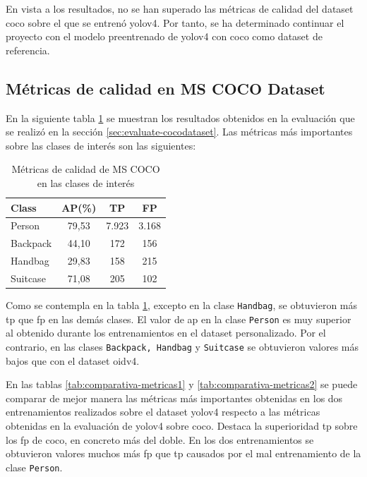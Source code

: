 En vista a los resultados, no se han superado las métricas de calidad del dataset \gls{coco} sobre el que se entrenó \gls{yolov4}. Por tanto, se ha determinado continuar el proyecto con el modelo preentrenado de \gls{yolov4} con \gls{coco} como dataset de referencia.

\subsection{Métricas de calidad en MS COCO Dataset}
\label{subsec:metricas-calidad-coco}

En la siguiente tabla \ref{tab:metricas-clases-coco} se muestran los resultados obtenidos en la evaluación que se realizó en la sección \ref{sec:evaluate-cocodataset}. Las métricas más importantes sobre las clases de interés son las siguientes:

\begin{table}[ht]
\centering
\caption{Métricas de calidad de MS COCO en las clases de interés}
\label{tab:metricas-clases-coco}
\begin{tabular}{lccc}
\hline
\textbf{Class} & \textbf{AP(\%)} & \textbf{TP} & \textbf{FP} \\ \hline
Person         & 79,53           & 7.923       & 3.168       \\
Backpack       & 44,10           & 172         & 156         \\
Handbag        & 29,83           & 158         & 215         \\
Suitcase       & 71,08           & 205         & 102         \\ \hline
\end{tabular}
\end{table}

Como se contempla en la tabla \ref{tab:metricas-clases-coco}, excepto en la clase \texttt{Handbag}, se obtuvieron más \gls{tp} que \gls{fp} en las demás clases. El valor de \gls{ap} en la clase \texttt{Person} es muy superior al obtenido durante los entrenamientos en el dataset personalizado. Por el contrario, en las clases \texttt{Backpack, Handbag} y \texttt{Suitcase} se obtuvieron valores más bajos que con el dataset \gls{oidv4}.

En las tablas \ref{tab:comparativa-metricas1} y \ref{tab:comparativa-metricas2} se puede comparar de mejor manera las métricas más importantes obtenidas en los dos entrenamientos realizados sobre el dataset \gls{yolov4} respecto a las métricas obtenidas en la evaluación de \gls{yolov4} sobre \gls{coco}. Destaca la superioridad \gls{tp} sobre los \gls{fp} de \gls{coco}, en concreto más del doble. En los dos entrenamientos se obtuvieron valores muchos más \gls{fp} que \gls{tp} causados por el mal entrenamiento de la clase \texttt{Person}.

